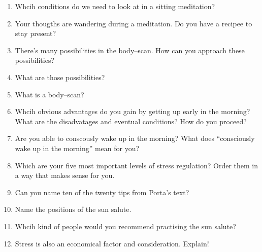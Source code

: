 \documentclass[../main.tex]{subfiles}
\begin{document}
\begin{enumerate}
\item Whcih conditions do we need to look at in a sitting meditation?
\item Your thougths are wandering during a meditation. Do you have a recipee to stay present?
\item There's many possibilities in the body--scan. How can you approach these possibilities?
  \item What are those possibilities?
  \item What is a body--scan?
  \item Whcih obvious advantages do you gain by getting up early in the morning?
    What are the disadvatages and eventual conditions? How do you proceed?
  \item Are you able to conscously wake up in the morning? What does ``consciously wake up in the morning'' mean for you?
    \vspace{4mm}
  \item Which are your five most important levels of stress regulation? Order them in a way that makes sense for you.
  \item Can you name ten of the twenty tips from Porta's text?
    \vspace{4mm}
  \item Name the positions of the sun salute.
  \item Whcih kind of people would you recommend practising the sun salute?
    \vspace{4mm}
    \item Stress is also an economical factor and consideration. Explain!
  \end{enumerate}
\end{document}
